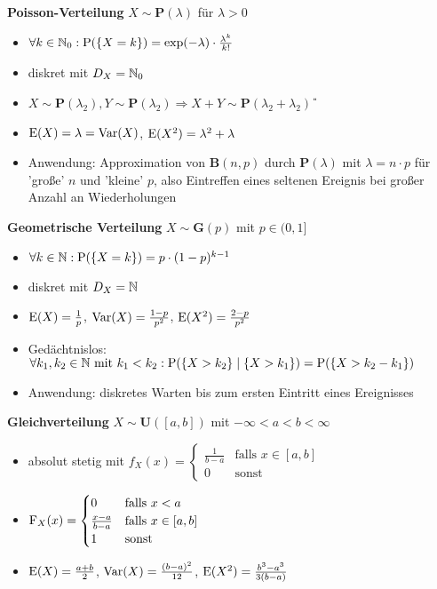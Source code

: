 \textbf{Poisson-Verteilung} $X\sim\mathbf{P}(\lambda)$ für $\lambda>0$
\begin{itemize}
\item $\forall k\in\mathbb{N}_0:\operatorname{P}(\{X=k\})=\exp(-\lambda)\cdot\frac{\lambda^k}{k!}$

\item diskret mit $D_X=\mathbb{N}_0$

\item $X\sim\mathbf{P}(\lambda_2), Y\sim\mathbf{P}(\lambda_2)
\Rightarrow X+Y\sim\mathbf{P}(\lambda_2 + \lambda_2)$ \U

\item $\operatorname{E}(X)=\lambda=\operatorname{Var}(X)$, $\operatorname{E}(X^2)=\lambda^2+\lambda$

\item Anwendung: Approximation von $\mathbf{B}(n,p)$ durch $\mathbf{P}(\lambda)$
mit $\lambda=n\cdot p$ für 'große' $n$ und 'kleine' $p$, also Eintreffen eines
seltenen Ereignis bei großer Anzahl an Wiederholungen
\end{itemize}

\textbf{Geometrische Verteilung} $X\sim\mathbf{G}(p)$ mit $p\in\textbf{(}0,1]$
\begin{itemize}
\item $\forall k\in\mathbb{N}:\operatorname{P}(\{X=k\})=p\cdot(1-p)^{k-1}$

\item diskret mit $D_X=\mathbb{N}$

\item $\operatorname{E}(X)=\frac{1}{p}$, $\operatorname{Var}(X)=\frac{1-p}{p^2}$, $\operatorname{E}(X^2)=\frac{2-p}{p^2}$

\item Gedächtnislos: $\forall k_1,k_2\in\mathbb{N} \text{ mit } k_1<k_2:
\operatorname{P}(\{X>k_2\}\mid \{ X>k_1\}) = \operatorname{P}(\{X>k_2-k_1\})$

\item Anwendung: diskretes Warten bis zum ersten Eintritt eines Ereignisses
\end{itemize}

\textbf{Gleichverteilung} $X\sim\mathbf{U}([a,b])$ mit $-\infty<a<b<\infty$
\begin{itemize}
\item absolut stetig mit 
$f_X(x)=\begin{cases}
\frac{1}{b-a} 	& \text{falls } x\in [a,b]	\\
0				& \text{sonst }		
\end{cases}$

\item
$\operatorname{F}_X(x)=\begin{cases}
0 				& \text{falls } x<a			\\
\frac{x-a}{b-a}	& \text{falls } x\in [a,b]	\\
1				& \text{sonst}
\end{cases}$

\item $\operatorname{E}(X)=\frac{a+b}{2}$, $\operatorname{Var}(X)=\frac{(b-a)^2}{12}$,
$\operatorname{E}(X^2)=\frac{b^3-a^3}{3(b-a)}$
\end{itemize}

